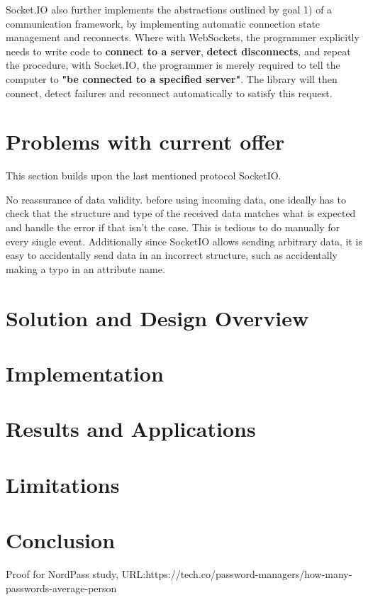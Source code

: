 \documentclass[conference]{IEEEtran}
\begin{document}
Socket.IO also further implements the abstractions outlined by goal 1) of a communication framework, by implementing automatic connection state management and reconnects. Where with WebSockets, the programmer explicitly needs to write code to \textbf{connect to a server},  \textbf{detect disconnects}, and repeat the procedure, with Socket.IO, the programmer is merely required to tell the computer to \textbf{"be connected to a specified server"}. The library will then connect, detect failures and reconnect automatically to satisfy this request.


\section{Problems with current offer}

This section builds upon the last mentioned protocol SocketIO.

No reassurance of data validity. before using incoming data, one ideally has to check that the structure and type of the received data matches what is expected and handle the error if that isn't the case. This is tedious to do manually for every single event. Additionally since SocketIO allows sending arbitrary data, it is easy to accidentally send data in an incorrect structure, such as accidentally making a typo in an attribute name.






\section{Solution and Design Overview}

\section{Implementation}

\section{Results and Applications}

\section{Limitations}

\section{Conclusion}




\listoffigures

\begin{thebibliography}{00}

     Proof for NordPass study, URL:https://tech.co/password-managers/how-many-passwords-average-person

\end{thebibliography}
\end{document}
